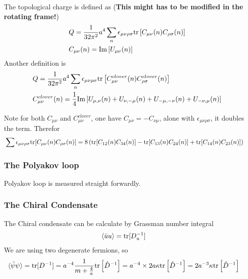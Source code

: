 The topological charge is defined as (\textbf{\textcolor[rgb]{1,0,0}{This might has to be modified in the rotating frame!}})
\begin{equation}
\begin{split}
&Q = \frac{1}{32\pi^2}a^4 \sum _n \epsilon _{\mu\nu\rho\sigma}{\rm tr}\left[C_{\mu\nu}(n)C_{\rho\sigma}(n)\right]\\
&C_{\mu\nu}(n)={\rm Im}\left[U_{\mu\nu}(n)\right]
\end{split}
\end{equation}
Another definition is
\begin{equation}
\begin{split}
&Q = \frac{1}{32\pi^2}a^4 \sum _n \epsilon _{\mu\nu\rho\sigma}{\rm tr}\left[C^{clover}_{\mu\nu}(n)C^{clover}_{\rho\sigma}(n)\right]\\
&C^{clover}_{\mu\nu}(n)=\frac{1}{4}{\rm Im}\left[U_{\mu,\nu}(n)+U_{\nu,-\mu}(n)+U_{-\mu,-\nu}(n)+U_{-\nu,\mu}(n)\right]
\end{split}
\end{equation}

Note for both $C_{\mu\nu}$ and $C_{\mu\nu}^{clover}$, one have $C_{\mu\nu}=-C_{\nu\mu}$, alone with $\epsilon _{\mu\nu\rho\sigma}$, it doubles the term. Therefor
\begin{equation}
\begin{split}
&\sum \epsilon _{\mu\nu\rho\sigma}{\rm tr}[C_{\mu\nu}(n)C_{\rho\sigma}(n)]=8 \left({\rm tr}[C_{12}(n)C_{34}(n)]-{\rm tr}[C_{13}(n)C_{24}(n)]+{\rm tr}[C_{14}(n)C_{23}(n)]\right)
\end{split}
\end{equation}

\subsubsection{\label{sec:RotatingPolyakovLoop}The Polyakov loop}

Polyakov loop is measured straight forwardly.

\subsubsection{\label{sec:RotatingChiralCondensate}The Chiral Condensate}

The Chiral condensate can be calculate by Grassman number integral
\begin{equation}
\begin{split}
&\langle \bar{u}u\rangle = {\rm tr}[D_u^{-1}]
\end{split}
\end{equation}
We are using two degenerate fermions, so
\begin{equation}
\begin{split}
&\langle \bar{\psi}\psi\rangle = {\rm tr}[D^{-1}]=a^{-4}\frac{1}{m+\frac{4}{a}}{\rm tr}\left[\hat{D}^{-1}\right]=a^{-4}\times 2a\kappa {\rm tr}\left[\hat{D}^{-1}\right]=2a^{-3}\kappa {\rm tr}\left[\hat{D}^{-1}\right]
\end{split}
\end{equation}

\clearpage
